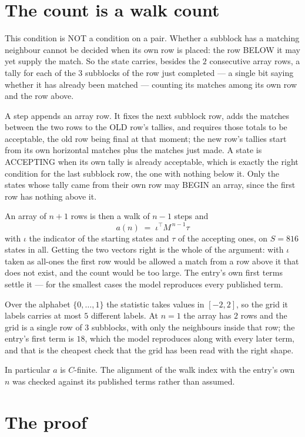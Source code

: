 \documentclass[11pt,a4paper]{article}
\theoremstyle{plain}
\theoremstyle{definition}
\begin{document}
\section{The count is a walk count}

This condition is NOT a condition on a pair. Whether a subblock has a
matching neighbour cannot be decided when its own row is placed: the row BELOW it may yet
supply the match. So the state carries, besides the $2$ consecutive array rows, a tally for
each of the $3$ subblocks of the row just completed --- a single bit saying whether it has already been matched --- counting its matches
among its own row and the row above.

A step appends an array row. It fixes the next subblock row, adds the matches between the two
rows to the OLD row's tallies, and requires those totals to be acceptable, the old row being
final at that moment; the new row's tallies start from its own horizontal matches plus the
matches just made. A state is ACCEPTING when its own tally is already acceptable, which is
exactly the right condition for the last subblock row, the one with nothing below it. Only the
states whose tally came from their own row may BEGIN an array, since the first row has nothing
above it.

An array of $n+1$ rows is then a walk of $n-1$ steps and
\[
a(n)\;=\;\iota^{\!\top}M^{\,n-1}\tau
\]
with $\iota$ the indicator of the starting states and $\tau$ of the accepting ones, on
$S=816$ states in all. Getting the two vectors right is the whole of the argument: with
$\iota$ taken as all-ones the first row would be allowed a match from a row above it that does
not exist, and the count would be too large. The entry's own first terms settle it --- for
the smallest cases
the model reproduces every published term.

Over the alphabet $\{0,\dots,1\}$ the statistic takes values in $[-2,2]$, so the
grid it labels carries at most $5$ different labels. At $n=1$ the array has $2$
rows and the grid is a single row of $3$
subblocks, with only the neighbours inside that row; the entry's first term is
$18$, which the model reproduces along with every later term, and that is the cheapest
check that the grid has been read with the right shape.

In particular $a$ is $C$-finite. The alignment of the walk index with the entry's own $n$ was
checked against its published terms rather than assumed.

\section{The proof}
\end{document}
